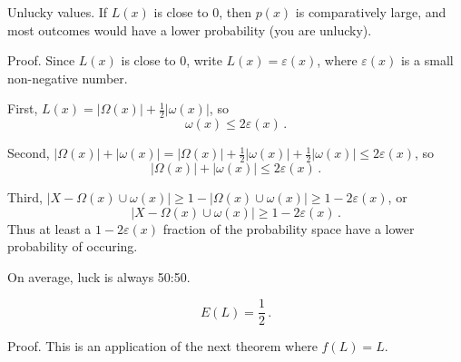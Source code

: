 \begin{theorem}{Unlucky values.}
If $L(x)$ is close to 0, then $p(x)$ is comparatively large, and most outcomes would have a lower probability (you are unlucky).

Proof.  Since $L(x)$ is close to 0, write $L(x)=\varepsilon(x)$, where $\varepsilon(x)$ is a small non-negative number.

First, $L(x)=|\Omega(x)|+\frac{1}{2}|\omega(x)|$, so
\begin{equation*}
\omega(x) \leq 2\varepsilon(x) \,.
\end{equation*}

Second, $|\Omega(x)|+|\omega(x)|=|\Omega(x)|+\frac{1}{2}|\omega(x)|+\frac{1}{2}|\omega(x)| \leq 2\varepsilon(x)$, so
\begin{equation*}
|\Omega(x)|+|\omega(x)| \leq 2\varepsilon(x) \,.
\end{equation*}

Third, $|X-\Omega(x) \cup \omega(x)| \geq 1-|\Omega(x) \cup \omega(x)| \geq 1-2\varepsilon(x)$, or 
\begin{equation*}
|X-\Omega(x) \cup \omega(x)| \geq 1-2\varepsilon(x) \,.
\end{equation*}
Thus at least a $1-2 \varepsilon(x)$ fraction of the probability space have a lower probability of occuring.
\end{theorem}

\begin{theorem}{On average, luck is always 50:50.}

\begin{equation*}
E(L)=\frac{1}{2} \,.
\end{equation*}

Proof.  This is an application of the next theorem where $f(L)=L$.
\end{theorem}


